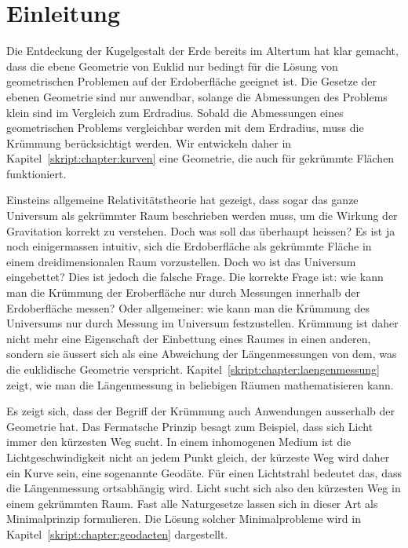 %
%
%
\chapter*{Einleitung\label{chapter:einleitung}}
\rhead{}
Die Entdeckung der Kugelgestalt der Erde bereits im Altertum hat
klar gemacht, dass die ebene Geometrie von Euklid nur bedingt für
die Lösung von geometrischen Problemen auf der Erdoberfläche geeignet
ist.
Die Gesetze der ebenen Geometrie sind nur anwendbar, solange 
die Abmessungen des Problems klein sind im Vergleich zum Erdradius.
Sobald die Abmessungen eines geometrischen Problems vergleichbar werden
mit dem Erdradius, muss die Krümmung berücksichtigt werden.
Wir entwickeln daher in Kapitel~\ref{skript:chapter:kurven}
eine Geometrie, die auch für gekrümmte Flächen funktioniert.

Einsteins allgemeine Relativitätstheorie hat gezeigt, dass sogar das
ganze Universum als gekrümmter Raum beschrieben werden muss, um die 
Wirkung der Gravitation korrekt zu verstehen.
Doch was soll das überhaupt heissen?
Es ist ja noch einigermassen intuitiv, sich die Erdoberfläche
als gekrümmte Fläche in einem dreidimensionalen Raum vorzustellen.
Doch wo ist das Universum eingebettet?
Dies ist jedoch die falsche Frage.
Die korrekte Frage ist: wie kann man die Krümmung der Eroberfläche
nur durch Messungen innerhalb der Erdoberfläche messen?
Oder allgemeiner: wie kann man die Krümmung des Universums nur durch
Messung im Universum festzustellen.
Krümmung ist daher nicht mehr eine Eigenschaft der Einbettung eines
Raumes in einen anderen, sondern sie äussert sich als eine Abweichung
der Längenmessungen von dem, was die euklidische Geometrie verspricht.
Kapitel~\ref{skript:chapter:laengenmessung} zeigt, wie man die Längenmessung
in beliebigen Räumen mathematisieren kann.

Es zeigt sich, dass der Begriff der Krümmung auch Anwendungen ausserhalb
der Geometrie hat.
Das Fermatsche Prinzip besagt zum Beispiel, dass sich Licht immer
den kürzesten Weg sucht.
In einem inhomogenen Medium ist die Lichtgeschwindigkeit nicht
an jedem Punkt gleich, der kürzeste Weg wird daher ein Kurve sein, eine
sogenannte Geodäte.
Für einen Lichtstrahl bedeutet das, dass die Längenmessung ortsabhängig wird.
Licht sucht sich also den kürzesten Weg in einem gekrümmten Raum.
Fast alle Naturgesetze lassen sich in dieser Art als Minimalprinzip
formulieren.
Die Lösung solcher Minimalprobleme wird in
Kapitel~\ref{skript:chapter:geodaeten} dargestellt.

